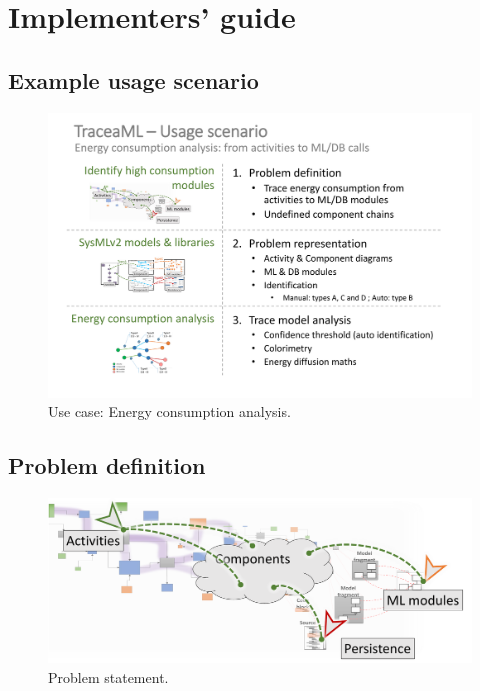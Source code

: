 \section{Implementers' guide}\label{sec:implguide}



\subsection{Example usage scenario}
\begin{figure}[h]     
	\centering
	\includegraphics[width=.99\linewidth]{images/scenarionrj.pdf}
	\caption{Use case: Energy consumption analysis.}
	\label{fig:scenarionrj}
\end{figure}


\subsection{Problem definition}
\begin{figure}[h]
	\centering
	\includegraphics[width=.6\linewidth]{images/energy1.pdf}
	\caption{Problem statement.}
	\label{fig:energy1}
\end{figure}

